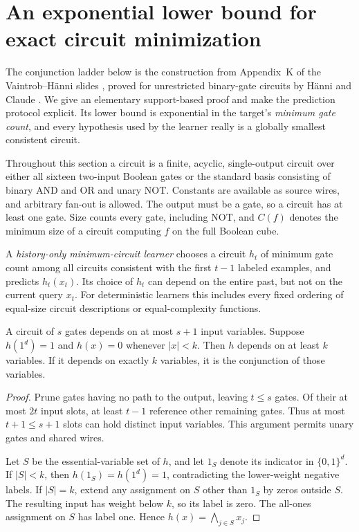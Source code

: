\section{An exponential lower bound for exact circuit minimization}
\label{sec:exact-occam-lower}

The conjunction ladder below is the construction from Appendix~K of
the Vaintrob--H\"anni slides \cite{slides}, proved for unrestricted
binary-gate circuits by H\"anni and Claude \cite{soi}.
We give an elementary support-based proof and make the prediction
protocol explicit. Its lower bound is exponential in the target's
\emph{minimum gate count}, and every hypothesis used by the learner
really is a globally smallest consistent circuit.

Throughout this section a circuit is a finite, acyclic, single-output
circuit over either all sixteen two-input Boolean gates or the standard
basis consisting of binary AND and OR and unary NOT. Constants are
available as source wires, and arbitrary fan-out is allowed. The output
must be a gate, so a circuit has at least one gate. Size counts every
gate, including NOT, and $C(f)$ denotes the minimum size of a circuit
computing $f$ on the full Boolean cube.

A \emph{history-only minimum-circuit learner} chooses a circuit $h_t$
of minimum gate count among all circuits consistent with the first
$t-1$ labeled examples, and predicts $h_t(x_t)$. Its choice of $h_t$
can depend on the entire past, but not on the current query $x_t$.
For deterministic learners this includes every fixed ordering of
equal-size circuit descriptions or equal-complexity functions.

\begin{lemma}
\label{lem:lower-support}
A circuit of $s$ gates depends on at most $s+1$ input variables.
Suppose $h(1^d)=1$ and $h(x)=0$ whenever $|x|<k$.
Then $h$ depends on at least $k$ variables. If it depends on exactly
$k$ variables, it is the conjunction of those variables.
\end{lemma}
\begin{proof}
Prune gates having no path to the output, leaving $t\le s$ gates.
Of their at most $2t$ input slots, at least $t-1$ reference other
remaining gates. Thus at most $t+1\le s+1$ slots can hold distinct
input variables. This argument permits unary gates and shared wires.

Let $S$ be the essential-variable set of $h$, and let $1_S$ denote
its indicator in $\{0,1\}^d$. If $|S|<k$, then
$h(1_S)=h(1^d)=1$, contradicting the lower-weight negative labels.
If $|S|=k$, extend any assignment on $S$ other than $1_S$ by zeros
outside $S$. The resulting input has weight below $k$, so its label
is zero. The all-ones assignment on $S$ has label one. Hence
$h(x)=\bigwedge_{j\in S}x_j$.
\end{proof}

